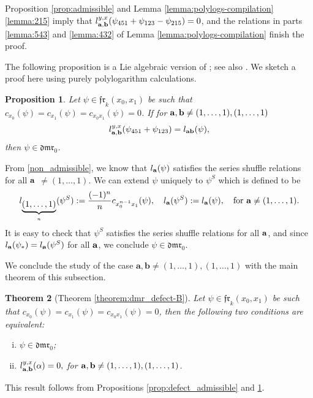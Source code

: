 \documentclass[a4paper,fleqn]{cas-sc}
\newtheorem{theorem}{Theorem}
\newtheorem{proposition}[theorem]{Proposition}
\begin{document}
\begin{pf}
	Proposition \ref{prop:admissible} and Lemma \ref{lemma:polylogs-compilation}\eqref{lemma:215} imply that $l^{y,x}_{{\bf{a},\bf{b}}}(\psi_{451}+\psi_{123}-\psi_{215})=0$, and the relations in parts \eqref{lemma:543} and \eqref{lemma:432} of Lemma \ref{lemma:polylogs-compilation} finish the proof.
\end{pf}

The following proposition is a Lie algebraic version of \cite[Proposition 3.2]{Furusho2011}; see also \cite[Theorem 3]{CS}. We sketch a proof here using purely polylogarithm calculations.
 
\begin{proposition}\label{prop:condition-dmr0}
Let $\psi\in \mathfrak{fr}_k(x_0,x_1)$ be such that $c_{x_0}(\psi)=c_{x_1}(\psi)= c_{x_0 x_1}(\psi)=0$.  If for ${\bf{a},\bf{b}}\ne (1,\dots,1),(1, \ldots, 1)$
	\begin{equation}\label{non_admissible}
		l^{y,x}_{\bf{a},\bf{b}}(\psi_{451}+\psi_{123})=l_{\bf{a}\bf{b}}(\psi),
	\end{equation}
	then $\psi\in \mathfrak{dmr}_0$.
\end{proposition}

\begin{pf}
	From \eqref{non_admissible}, we know that $l_{\bf{a}}(\psi)$ satisfies the series shuffle relations for all $\bf{a}$ $\neq (1,\dots,1)$. We can extend $\psi$ uniquely to $\psi^S$ which is defined to be 
$$
	l_{\underbrace{(1,\dots,1)}_{n}}(\psi^{S}):=\frac{(-1)^{n}}{n}c_{x^{n-1}_0x_1}(\psi),\quad l_{\bf{a}}(\psi^S):=l_{\bf{a}}(\psi),\quad \text{for } {\bf{a}}\ne (1,\dots,1).
$$
    It is easy to check that $\psi^S$ satisfies the series shuffle relations for all $\bf{a}$, and since
	 $l_{\bf{a}}(\psi_{*})=l_{\bf{a}}(\psi^S)$ for all $\bf{a}$, we conclude $\psi\in \mathfrak{dmr}_0$.
\end{pf}

We conclude the study of the case $\textbf{a},\textbf{b} \neq (1, \ldots, 1),(1, \ldots, 1)$ with the main theorem of this subsection.

\begin{theorem}[Theorem \ref{theorem:dmr_defect-B}]
\label{theorem:dmr_defect}
	Let $\psi\in \mathfrak{fr}_k(x_0,x_1)$ be such that $c_{x_0}(\psi)=c_{x_1}(\psi)= c_{x_0 x_1}(\psi)=0$, then the following two conditions are equivalent:
	\begin{enumerate}[(i)] %
		\item $\psi\in \mathfrak{dmr}_0$;
		\item $l^{y,x}_{\bf{a},\bf{b}}(\alpha)=0,$ for ${\bf{a},\bf{b}}\ne (1,\dots,1),(1,\dots,1)$.
	\end{enumerate}
\end{theorem}
\begin{pf}
	This result follows from Propositions \ref{prop:defect_admissible} and \ref{prop:condition-dmr0}.
\end{pf}
\end{document}
